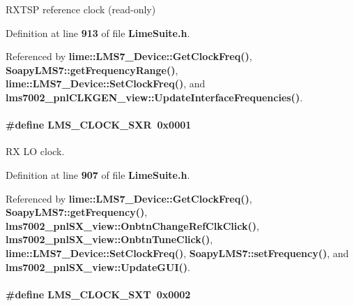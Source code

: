 R\+X\+T\+SP reference clock (read-\/only) 



Definition at line {\bf 913} of file {\bf Lime\+Suite.\+h}.



Referenced by {\bf lime\+::\+L\+M\+S7\+\_\+\+Device\+::\+Get\+Clock\+Freq()}, {\bf Soapy\+L\+M\+S7\+::get\+Frequency\+Range()}, {\bf lime\+::\+L\+M\+S7\+\_\+\+Device\+::\+Set\+Clock\+Freq()}, and {\bf lms7002\+\_\+pnl\+C\+L\+K\+G\+E\+N\+\_\+view\+::\+Update\+Interface\+Frequencies()}.

\paragraph[{L\+M\+S\+\_\+\+C\+L\+O\+C\+K\+\_\+\+S\+XR}]{\setlength{\rightskip}{0pt plus 5cm}\#define L\+M\+S\+\_\+\+C\+L\+O\+C\+K\+\_\+\+S\+XR~0x0001}\label{group__LMS__CLOCK__ID_gad6ab0c09df6c5e25e420d19f69497817}


RX LO clock. 



Definition at line {\bf 907} of file {\bf Lime\+Suite.\+h}.



Referenced by {\bf lime\+::\+L\+M\+S7\+\_\+\+Device\+::\+Get\+Clock\+Freq()}, {\bf Soapy\+L\+M\+S7\+::get\+Frequency()}, {\bf lms7002\+\_\+pnl\+S\+X\+\_\+view\+::\+Onbtn\+Change\+Ref\+Clk\+Click()}, {\bf lms7002\+\_\+pnl\+S\+X\+\_\+view\+::\+Onbtn\+Tune\+Click()}, {\bf lime\+::\+L\+M\+S7\+\_\+\+Device\+::\+Set\+Clock\+Freq()}, {\bf Soapy\+L\+M\+S7\+::set\+Frequency()}, and {\bf lms7002\+\_\+pnl\+S\+X\+\_\+view\+::\+Update\+G\+U\+I()}.

\paragraph[{L\+M\+S\+\_\+\+C\+L\+O\+C\+K\+\_\+\+S\+XT}]{\setlength{\rightskip}{0pt plus 5cm}\#define L\+M\+S\+\_\+\+C\+L\+O\+C\+K\+\_\+\+S\+XT~0x0002}\label{group__LMS__CLOCK__ID_gad8512e8c6346b2da2cdc68914c421b44}


